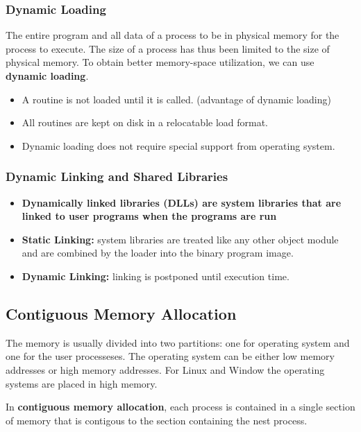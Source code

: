 \documentclass[10pt]{article}
\newcommand{\tf}{\textbf}
\begin{document}
\subsubsection{Dynamic Loading}

\par{The entire program and all data of a process to be in physical memory for the process to execute. The size of a process has thus been limited to the size of physical memory. To obtain better memory-space utilization, we can use \tf{dynamic loading}.}

\begin{itemize}
	\item A routine is not loaded until it is called. (advantage of dynamic loading)
	\item All routines are kept on disk in a relocatable load format.
	\item Dynamic loading does not require special support from operating system.
\end{itemize}

\subsubsection{Dynamic Linking and Shared Libraries}

\begin{itemize}
	\item \tf{Dynamically linked libraries (DLLs) are system libraries that are linked to user programs when the programs are run}
	\item \tf{Static Linking:} system libraries are treated like any other object module and are combined by the loader into the binary program image.
	\item \tf{Dynamic Linking:} linking is postponed until execution time.
\end{itemize}

\subsection{Contiguous Memory Allocation}

\par{The memory is usually divided into two partitions: one for operating system and one for the user processeses. The operating system can be either low memory addresses or high memory addresses. For Linux and Window the operating systems are placed in high memory.} \\

\par{In \tf{contiguous memory allocation}, each process is contained in a single section of memory that is contigous to the section containing the nest process.}
\end{document}
